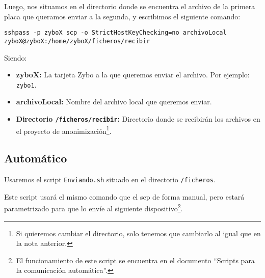 \documentclass[12pt,letterpaper]{article}
\begin{document}
Luego, nos situamos en el directorio donde se encuentra el archivo de la primera placa que queramos enviar a la segunda, y escribimos el siguiente comando:
\begin{center}
	\texttt{sshpass -p zyboX scp -o StrictHostKeyChecking=no archivoLocal zyboX@zyboX:/home/zyboX/ficheros/recibir}
\end{center}
Siendo:
\begin{itemize}
	\item \textbf{zyboX:} La tarjeta Zybo a la que queremos enviar el archivo. Por ejemplo: \texttt{zybo1}.
	\item \textbf{archivoLocal:} Nombre del archivo local que queremos enviar.
	\item \textbf{Directorio \texttt{/ficheros/recibir}:} Directorio donde se recibirán los archivos en el proyecto de anonimización\footnote{Si quieremos cambiar el directorio, solo tenemos que cambiarlo al igual que en la nota anterior.}.
\end{itemize}

\subsection{Automático}
Usaremos el script \texttt{Enviando.sh} situado en el directorio \texttt{/ficheros}.

Este script usará el mismo comando que el scp de forma manual, pero estará parametrizado para que lo envíe al siguiente dispositivo\footnote{El funcionamiento de este script se encuentra en el documento ``Scripts para la comunicación automática''.}.
\end{document}
